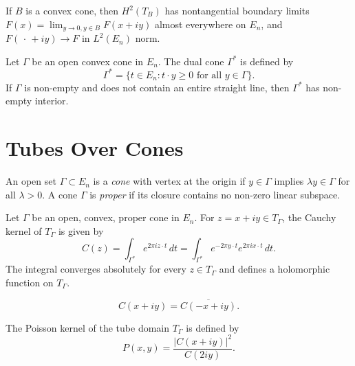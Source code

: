\begin{theorem}\label{thm:c3-2-11}
If $B$ is a convex cone, then $H^2(T_B)$ has nontangential boundary limits $F(x) = \lim_{y \to 0, y \in B} F(x + iy)$ almost everywhere on $E_n$, and $F(\,\cdot\, + iy) \to F$ in $L^2(E_n)$ norm.
\end{theorem}

\begin{lemma}\label{lem:c3-2-12}
Let $\Gamma$ be an open convex cone in $E_n$. The dual cone $\Gamma^*$ is defined by
\begin{equation}\label{eq:c3-2-13}
\Gamma^* = \{t \in E_n : t \cdot y \geq 0 \text{ for all } y \in \Gamma\}.
\end{equation}
If $\Gamma$ is non-empty and does not contain an entire straight line, then $\Gamma^*$ has non-empty interior.
\end{lemma}

\section{Tubes Over Cones}

An open set $\Gamma \subset E_n$ is a \emph{cone} with vertex at the origin if $y \in \Gamma$ implies $\lambda y \in \Gamma$ for all $\lambda > 0$. A cone $\Gamma$ is \emph{proper} if its closure contains no non-zero linear subspace.

\begin{theorem}\label{thm:c3-3-1}
Let $\Gamma$ be an open, convex, proper cone in $E_n$. For $z = x + iy \in T_\Gamma$, the Cauchy kernel of $T_\Gamma$ is given by
\begin{equation}\label{eq:c3-3-2}
C(z) = \int_{\Gamma^*} e^{2\pi i z \cdot t}\,dt = \int_{\Gamma^*} e^{-2\pi y \cdot t} e^{2\pi i x \cdot t}\,dt.
\end{equation}
The integral converges absolutely for every $z \in T_\Gamma$ and defines a holomorphic function on $T_\Gamma$.
\end{theorem}

\begin{equation}\label{eq:c3-3-3}
C(x + iy) = \overline{C(-x + iy)}.
\end{equation}

\begin{corollary}\label{cor:c3-3-4}
The Poisson kernel of the tube domain $T_\Gamma$ is defined by
\begin{equation}\label{eq:c3-3-5}
P(x, y) = \frac{|C(x + iy)|^2}{C(2iy)}.
\end{equation}
\end{corollary}

